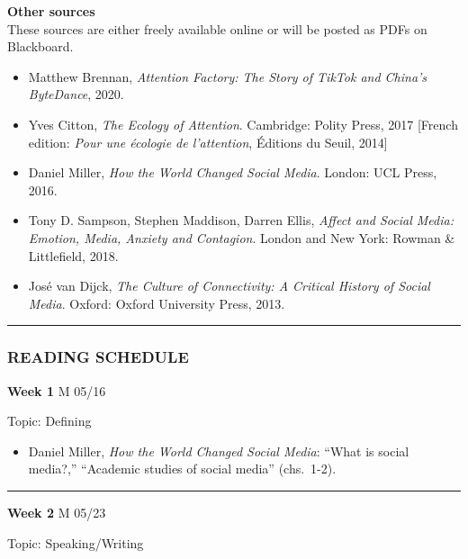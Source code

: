 \documentclass[]{tufte-handout}
\providecommand{\tightlist}{%
  \setlength{\itemsep}{0pt}\setlength{\parskip}{0pt}}
\begin{document}
\textbf{Other sources}\\
These sources are either freely available online or will be posted as
PDFs on Blackboard.

\begin{itemize}
\tightlist
\item
  Matthew Brennan, \emph{Attention Factory: The Story of TikTok and
  China's ByteDance}, 2020.
\item
  Yves Citton, \emph{The Ecology of Attention}. Cambridge: Polity Press,
  2017 {[}French edition: \emph{Pour une écologie de l'attention},
  Éditions du Seuil, 2014{]}\\
\item
  Daniel Miller, \emph{How the World Changed Social Media}. London: UCL
  Press, 2016.\\
\item
  Tony D. Sampson, Stephen Maddison, Darren Ellis, \emph{Affect and
  Social Media: Emotion, Media, Anxiety and Contagion}. London and New
  York: Rowman \& Littlefield, 2018.\\
\item
  José van Dijck, \emph{The Culture of Connectivity: A Critical History
  of Social Media}. Oxford: Oxford University Press, 2013.
\end{itemize}

\begin{center}\rule{0.5\linewidth}{0.5pt}\end{center}

\hypertarget{reading-schedule}{%
\subsubsection{READING SCHEDULE}\label{reading-schedule}}

\textbf{Week 1} M 05/16

Topic: Defining

\begin{itemize}
\tightlist
\item
  Daniel Miller, \emph{How the World Changed Social Media}: ``What is
  social media?,'' ``Academic studies of social media'' (chs.~1-2).
\end{itemize}

\begin{center}\rule{0.5\linewidth}{0.5pt}\end{center}

\textbf{Week 2} M 05/23

Topic: Speaking/Writing
\end{document}
